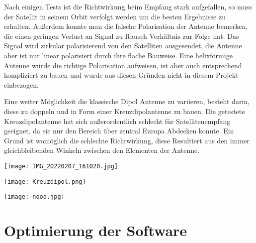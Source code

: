 \newpage
\begin{multicols*}{2}

    Nach einigen Tests ist die Richtwirkung beim Empfang stark aufgefallen, so muss der Satellit in seinem Orbit verfolgt werden um die besten Ergebnisse zu erhalten. Außerdem konnte man die falsche Polarisation der Antenne bemerken, die einen geringen Verlust an Signal zu Rausch Verhältnis zur Folge hat. Das Signal wird zirkular polarisierend von den Satelliten ausgesendet, die Antenne aber ist nur linear polarisiert durch ihre flache Bauweise. Eine helixförmige Antenne würde die richtige Polarisation aufweisen, ist aber auch entsprechend kompliziert zu bauen und wurde aus diesen Gründen nicht in diesem Projekt einbezogen. 

    Eine weiter Möglichkeit die klassische Dipol Antenne zu variieren, besteht darin, diese zu doppeln und in Form einer Kreuzdipolantenne zu bauen. Die getestete Kreuzdipolantenne hat sich außerordentlich schlecht für Satellitenempfang geeignet, da sie nur den Bereich über zentral Europa Abdecken konnte. Ein Grund ist womöglich die schlechte Richtwirkung, diese Resultiert aus den immer gleichbleibenden Winkeln zwischen den Elementen der Antenne. 
    
    \begin{center}
        \centering
        \texttt{[image: IMG\_20220207\_161020.jpg]}
    \end{center}
\end{multicols*}



\begin{center}
    \centering
    \texttt{[image: Kreuzdipol.png]}
\end{center}

\begin{center}
    \centering
    \texttt{[image: nooa.jpg]}
\end{center}



\section[]{Optimierung der Software}
